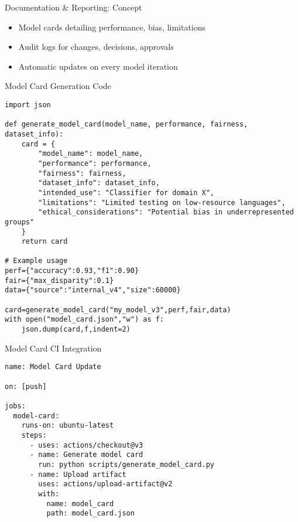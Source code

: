 \documentclass[aspectratio=169]{beamer}
\begin{document}
\begin{frame}{Documentation \& Reporting: Concept}
\begin{itemize}
\item Model cards detailing performance, bias, limitations
\item Audit logs for changes, decisions, approvals
\item Automatic updates on every model iteration
\end{itemize}
\end{frame}

\begin{frame}[fragile]{Model Card Generation Code}

\begin{verbatim}
import json

def generate_model_card(model_name, performance, fairness, dataset_info):
    card = {
        "model_name": model_name,
        "performance": performance,
        "fairness": fairness,
        "dataset_info": dataset_info,
        "intended_use": "Classifier for domain X",
        "limitations": "Limited testing on low-resource languages",
        "ethical_considerations": "Potential bias in underrepresented groups"
    }
    return card

# Example usage
perf={"accuracy":0.93,"f1":0.90}
fair={"max_disparity":0.1}
data={"source":"internal_v4","size":60000}

card=generate_model_card("my_model_v3",perf,fair,data)
with open("model_card.json","w") as f:
    json.dump(card,f,indent=2)
\end{verbatim}
\end{frame}

\begin{frame}[fragile]{Model Card CI Integration}

\begin{verbatim}
name: Model Card Update

on: [push]

jobs:
  model-card:
    runs-on: ubuntu-latest
    steps:
      - uses: actions/checkout@v3
      - name: Generate model card
        run: python scripts/generate_model_card.py
      - name: Upload artifact
        uses: actions/upload-artifact@v2
        with:
          name: model_card
          path: model_card.json
\end{verbatim}
\end{frame}
\end{document}
